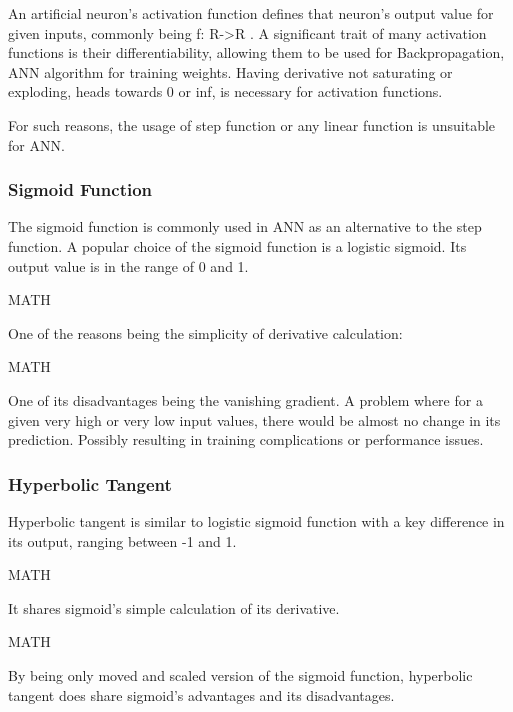 An artificial neuron's activation function defines that neuron's output value
for given inputs, commonly being f: R->R \cite{leskovec2020mining}. A significant trait of many activation functions is their differentiability, allowing them to be used for Backpropagation, ANN algorithm for training weights. Having derivative not saturating or exploding, heads towards 0 or inf, is necessary for activation functions.

For such reasons, the usage of step function or any linear function is unsuitable for ANN.
\subsubsection{Sigmoid Function}
The sigmoid function is commonly used in ANN as an alternative to the step function. A popular choice of the sigmoid function is a logistic sigmoid. Its output value is in the range of 0 and 1.

MATH

One of the reasons being the simplicity of derivative calculation:

MATH

One of its disadvantages being the vanishing gradient. A problem where for a given very high or very low input values, there would be almost no change in its prediction. Possibly resulting in training complications or performance issues.\cite{7typesactivationfunctions}


\subsubsection{Hyperbolic Tangent}

Hyperbolic tangent is similar to logistic sigmoid function with a key difference in its output, ranging between -1 and 1.

MATH

It shares sigmoid's simple calculation of its derivative.

MATH

By being only moved and scaled version of the sigmoid function, hyperbolic tangent does share sigmoid's advantages and its disadvantages.\cite{leskovec2020mining}


